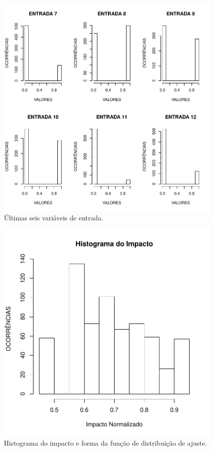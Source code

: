 \begin{figure}[h]
  \vspace{-0.2cm}
  \centering
  \includegraphics[width=0.7\columnwidth]{image/input7_12.pdf}
  \caption{Últimas seis variáveis de entrada.}
  \label{fig:input712}
\end{figure}

\begin{figure}[h]
  \vspace{-0.2cm}
  \centering
  \includegraphics[width=0.5\columnwidth]{image/impact_histogram.pdf}
  \caption{Histograma do impacto e forma da função de distribuição de ajuste.}
  \label{fig:impacthistogram}
\end{figure}

